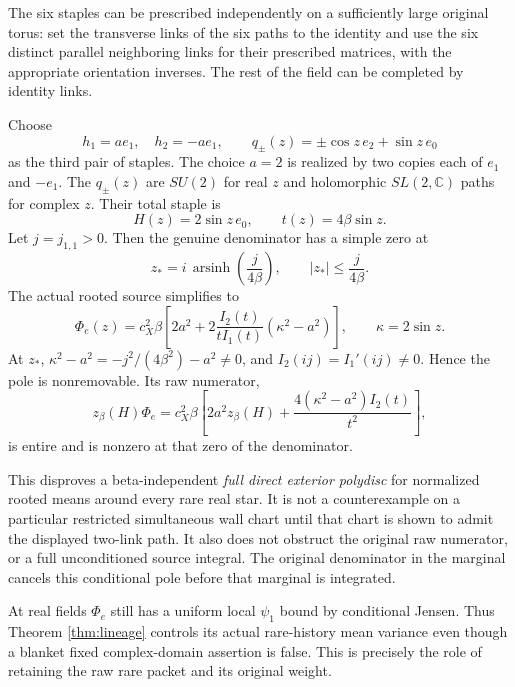 \documentclass[11pt,letterpaper]{article}
\theoremstyle{remark}\newtheorem{remark}[theorem]{Remark}
\begin{document}
The six staples can be prescribed independently on a sufficiently large original torus: set the transverse links of the six paths to the identity and use the six distinct parallel neighboring links for their prescribed matrices, with the appropriate orientation inverses. The rest of the field can be completed by identity links.

Choose
\[
 h_1=ae_1,\quad h_2=-ae_1,\qquad
 q_\pm(z)=\pm\cos z\,e_2+\sin z\,e_0
\]
as the third pair of staples. The choice \(a=2\) is realized by two copies each of \(e_1\) and \(-e_1\). The \(q_\pm(z)\) are \(SU(2)\) for real \(z\) and holomorphic \(SL(2,\mathbb C)\) paths for complex \(z\). Their total staple is
\[
 H(z)=2\sin z\,e_0,\qquad t(z)=4\beta\sin z.
\]
Let \(j=j_{1,1}>0\). Then the genuine denominator has a simple zero at
\begin{equation}\label{eq:pole}
 \boxed{\quad
 z_*=i\,\operatorname{arsinh}\!\left(\frac{j}{4\beta}\right),
 \qquad |z_*|\le\frac{j}{4\beta}.
 \quad}
\end{equation}
The actual rooted source simplifies to
\[
 \Phi_e(z)=c_X^2\beta\left[
 2a^2+2\frac{I_2(t)}{tI_1(t)}(\kappa^2-a^2)\right],
 \qquad\kappa=2\sin z.
\]
At \(z_*\), \(\kappa^2-a^2=-j^2/(4\beta^2)-a^2\ne0\), and
\(I_2(ij)=I_1'(ij)\ne0\). Hence the pole is nonremovable. Its raw numerator,
\[
 z_\beta(H)\Phi_e
 =c_X^2\beta\left[
 2a^2z_\beta(H)+
 \frac{4(\kappa^2-a^2)I_2(t)}{t^2}\right],
\]
is entire and is nonzero at that zero of the denominator.

This disproves a beta-independent \emph{full direct exterior polydisc} for normalized rooted means around every rare real star. It is not a counterexample on a particular restricted simultaneous wall chart until that chart is shown to admit the displayed two-link path. It also does not obstruct the original raw numerator, or a full unconditioned source integral. The original denominator in the marginal cancels this conditional pole before that marginal is integrated.

At real fields \(\Phi_e\) still has a uniform local \(\psi_1\) bound by conditional Jensen. Thus Theorem \ref{thm:lineage} controls its actual rare-history mean variance even though a blanket fixed complex-domain assertion is false. This is precisely the role of retaining the raw rare packet and its original weight.
\end{document}
